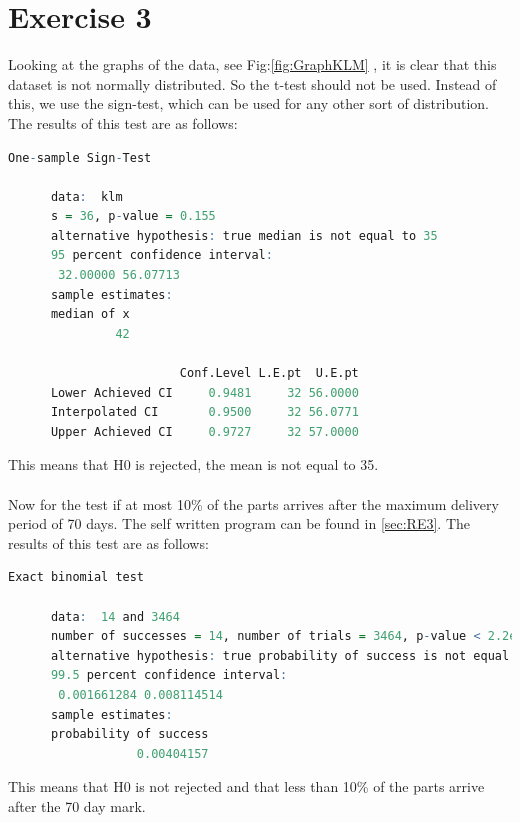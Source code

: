 \documentclass{article}
\begin{document}
  \section{Exercise 3}
    Looking at the graphs of the data, see Fig:\ref{fig:GraphKLM} , it is clear that this dataset is not normally distributed.
    So the t-test should not be used.
    Instead of this, we use the sign-test, which can be used for any other sort of distribution.
    The results of this test are as follows:\\
    \begin{lstlisting}[language=R]
        One-sample Sign-Test

      data:  klm
      s = 36, p-value = 0.155
      alternative hypothesis: true median is not equal to 35
      95 percent confidence interval:
       32.00000 56.07713
      sample estimates:
      median of x 
               42 

                        Conf.Level L.E.pt  U.E.pt
      Lower Achieved CI     0.9481     32 56.0000
      Interpolated CI       0.9500     32 56.0771
      Upper Achieved CI     0.9727     32 57.0000
    \end{lstlisting}
    This means that H0 is rejected, the mean is not equal to 35.\\\\    
    Now for the test if at most 10\% of the parts arrives after the maximum delivery period of 70 days.
    The self written program can be found in \ref{sec:RE3}.
    The results of this test are as follows:\\
    \begin{lstlisting}[language=R]
        Exact binomial test

      data:  14 and 3464
      number of successes = 14, number of trials = 3464, p-value < 2.2e-16
      alternative hypothesis: true probability of success is not equal to 0.5
      99.5 percent confidence interval:
       0.001661284 0.008114514
      sample estimates:
      probability of success 
                  0.00404157 
    \end{lstlisting}
    This means that H0 is not rejected and that less than 10\% of the parts arrive after the 70 day mark.
\end{document}

